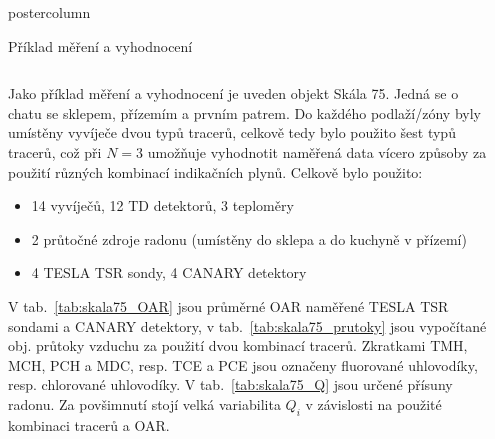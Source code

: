 \documentclass{beamer}
\begin{document}
\begin{frame}
\begin{columns}
\begin{column}{.57\textwidth}
\begin{beamercolorbox}[center]{postercolumn}
\begin{minipage}{.98\textwidth}
{\begin{myblock}{Příklad měření a vyhodnocení}
    \begin{columns}
        \centering
        \begin{column}{.69\textwidth}
            Jako příklad měření a vyhodnocení je uveden objekt Skála 75. Jedná se o chatu se sklepem, přízemím a prvním patrem. Do každého podlaží/zóny byly umístěny vyvíječe dvou typů tracerů, celkově tedy bylo použito šest typů tracerů, což při $N=3$ umožňuje vyhodnotit naměřená data vícero způsoby za použití různých kombinací indikačních plynů. Celkově bylo použito: 
            \begin{itemize}
                \item 14 vyvíječů, 12 TD detektorů, 3 teploměry
                \item 2 průtočné zdroje radonu (umístěny do sklepa a do kuchyně v přízemí)
                \item 4 TESLA TSR sondy, 4 CANARY detektory
            \end{itemize}
            V tab.~\ref{tab:skala75_OAR} jsou průměrné OAR naměřené TESLA TSR sondami a CANARY detektory, v tab.~\ref{tab:skala75_prutoky} jsou vypočítané obj. průtoky vzduchu za použití dvou kombinací tracerů. Zkratkami TMH, MCH, PCH a MDC, resp. TCE a PCE jsou označeny fluorované uhlovodíky, resp. chlorované uhlovodíky.
V tab.~\ref{tab:skala75_Q} jsou určené přísuny radonu. Za povšimnutí stojí velká variabilita $Q_i$ v závislosti na použité kombinaci tracerů a OAR.
        \end{column}
        \begin{column}{.3\textwidth}


\end{column}
\end{columns}
\end{myblock}}
\end{minipage}
\end{beamercolorbox}
\end{column}
\end{columns}
\end{frame}
\end{document}
